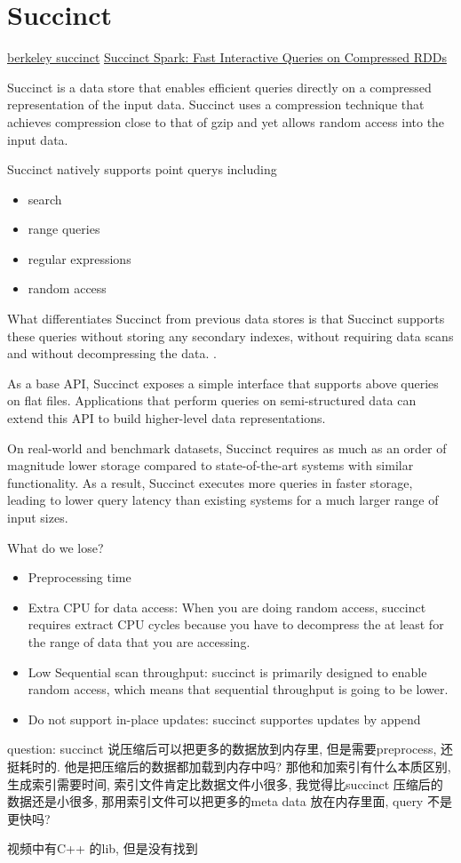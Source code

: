 \chapter{Succinct}
\href{http://succinct.cs.berkeley.edu/}{berkeley succinct}
\href{https://www.youtube.com/watch?v=O1a6YxFMp0g}{Succinct Spark: Fast Interactive Queries on Compressed RDDs}

Succinct is a data store that enables efficient queries directly on a compressed representation of the input data.
Succinct uses a compression technique that achieves compression close to that of gzip and yet allows random access into the input data.

Succinct natively supports point querys including
\begin{itemize}
\item search
\item range queries
\item regular expressions
\item random access
\end{itemize}

What differentiates Succinct from previous data stores is that Succinct supports these queries without storing any secondary indexes, without requiring data scans and without decompressing the data.
.

As a base API, Succinct exposes a simple interface that supports above queries on flat files.
Applications that perform queries on semi-structured data can extend this API to build higher-level data representations.

On real-world and benchmark datasets, Succinct requires as much as an order of magnitude lower storage compared to state-of-the-art systems with similar functionality.
As a result, Succinct executes more queries in faster storage, leading to lower query latency than existing systems for a much larger range of input sizes.

What do we lose?
\begin{itemize}
\item Preprocessing time
\item Extra CPU for data access: When you are doing random access, succinct requires extract CPU cycles because you have to decompress the at least for the range of data that you are accessing.
\item Low Sequential scan throughput: succinct is primarily designed to enable random access, which means that sequential throughput is going to be lower.
\item Do not support in-place updates: succinct supportes updates by append
\end{itemize}

question:
succinct 说压缩后可以把更多的数据放到内存里, 但是需要preprocess, 还挺耗时的.
他是把压缩后的数据都加载到内存中吗?
那他和加索引有什么本质区别, 生成索引需要时间, 索引文件肯定比数据文件小很多, 我觉得比succinct 压缩后的数据还是小很多, 那用索引文件可以把更多的meta data 放在内存里面, query 不是更快吗?

视频中有C++ 的lib, 但是没有找到

